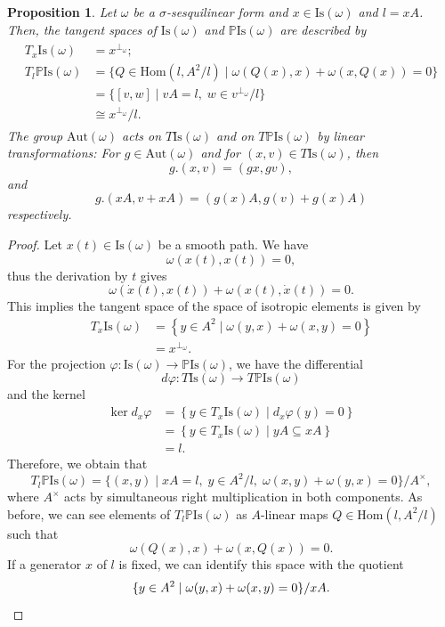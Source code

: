\documentclass[oneside,11pt]{amsart}
\newtheorem{prop}[thm]{Proposition}
\theoremstyle{definition}
\theoremstyle{remark}
\numberwithin{thm}{section}
\numberwithin{equation}{section}
\begin{document}
\begin{prop}\label{prop:tangent_gen_omega}
    Let $\omega$ be a $\sigma$-sesquilinear form and $x\in \mathrm{Is}(\omega)$ and $l=xA$. Then, the tangent spaces of $\mathrm{Is}(\omega)$ and $\mathbb{P}\mathrm{Is}(\omega)$ are described by
\begin{align}
\begin{aligned}
T_x\mathrm{Is}\left(\omega\right) & =x^{\perp_\omega};\\
T_l\mathbb{P}\mathrm{Is}\left(\omega\right) & =\{Q\in\mathrm{Hom}(l,A^2/l)\mid \omega(Q(x),x)+\omega(x,Q(x))=0\}\\
&=\{[v,w] \mid  vA=l,\;w\in v^{\perp_\omega}/l\}\\ 
&\cong x^{\perp_{\omega}}/l.
\end{aligned}
\end{align}
The group $\mathrm{Aut}(\omega)$ acts on $T\mathrm{Is}(\omega)$ and on $T\mathbb P\mathrm{Is}(\omega)$ by linear transformations: For $g\in \mathrm{Aut}(\omega)$ and for $(x,v)\in T\mathrm{Is}(\omega)$, then 
\[g.(x,v)=(gx,gv),\]
and 
\[g.(xA,v+xA)=(g(x)A,g(v)+g(x)A)\]
respectively.
\end{prop}

\begin{proof}
Let $x(t)\in \mathrm{Is}\left( {\omega } \right)$ be a smooth path. We have 
\[
 \omega(x(t),x(t))=0,
\]
thus the derivation by $t$ gives 
\[
\omega(\dot{x}(t),x(t))+\omega(x(t),\dot{x}(t))=0.
\]
\noindent This implies the tangent space of the space of isotropic elements is given by	
\begin{align*}
    {{T}_{x}}\mathrm{Is}\left( {{\omega }} \right)&=\left\{ y\in A^{2}\mid \omega(y,x) + \omega(x,y)=0  \right\}\\
    &=x^{\perp_{\omega}}.
\end{align*}
For the projection $\varphi\colon\mathrm{Is}\left( {{\omega }} \right)\to \mathbb{P}\mathrm{Is}\left( {{\omega }} \right)$, we have the differential 
$$d\varphi\colon T\mathrm{Is}\left( {{\omega }} \right)\to T\mathbb{P}\mathrm{Is}(\omega)$$ 
and the kernel
\begin{align*}
\ker d_x\varphi & =\left\{ y\in {{T}_{x}}\mathrm{Is}(\omega)\mid d_x\varphi(y)=0 \right\}\\
& =\left\{ y\in {{T}_{x}}\mathrm{Is}\left( {{\omega }} \right) \mid yA\subseteq x{{A}} \right\}\\
& =l.
\end{align*}
Therefore, we obtain that 
$$
{{T}_l}\mathbb{P}\mathrm{Is}\left( {{\omega }} \right)= \{(x,y)\mid xA=l,\; y\in A^2/l,\; \omega(x,y)+\omega(y,x)=0\}/A^\times,
$$ 
where $A^\times$ acts by simultaneous right multiplication in both  components. As before, we can see elements of ${{T}_l}\mathbb{P}\mathrm{Is}(\omega)$ as $A$-linear maps $Q\in\mathrm{Hom}(l,A^2/l)$ such that $$
\omega(Q(x),x)+\omega(x,Q(x))=0.
$$ 
If a generator $x$ of $l$ is fixed, we can identify this space with the quotient 
\begin{equation*}
    \{ y\in A^{2}\mid \omega(y,x)+\omega(x,y)=0\}/xA.\qedhere
\end{equation*}
\end{proof}
\end{document}
